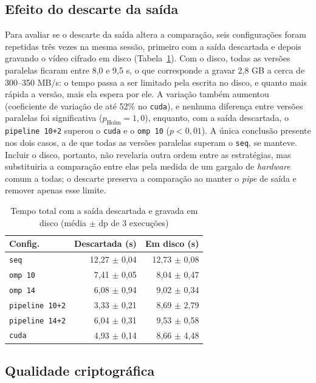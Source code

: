 \documentclass[12pt]{article}
\begin{document}
\subsection{Efeito do descarte da saída}
\label{sec:sensibilidade}

Para avaliar se o descarte da saída altera a comparação, seis configurações
foram repetidas três vezes na mesma sessão, primeiro com a saída descartada e
depois gravando o vídeo cifrado em disco (Tabela~\ref{tab:disco}). Com o disco,
todas as versões paralelas ficaram entre 8,0 e 9,5 s, o que corresponde a gravar
2,8 GB a cerca de 300--350 MB/s: o tempo passa a ser limitado pela escrita no
disco, e quanto mais rápida a versão, mais ela espera por ele. A variação
também aumentou (coeficiente de variação de até 52\% no \texttt{cuda}), e
nenhuma diferença entre versões paralelas foi significativa ($p_{\mathrm{Holm}}
= 1{,}0$), enquanto, com a saída descartada, o \texttt{pipeline 10+2} superou o
\texttt{cuda} e o \texttt{omp 10} ($p < 0{,}01$). A única conclusão presente
nos dois casos, a de que todas as versões paralelas superam o \texttt{seq}, se
manteve. Incluir o disco, portanto, não revelaria outra ordem entre as
estratégias, mas substituiria a comparação entre elas pela medida de um
gargalo de \textit{hardware} comum a todas; o descarte preserva a comparação ao
manter o \textit{pipe} de saída e remover apenas esse limite.

\begin{table}[ht]
\centering
\small
\caption{Tempo total com a saída descartada e gravada em disco (média $\pm$ dp
de 3 execuções)}
\label{tab:disco}
\begin{tabular}{lrr}
\hline
\textbf{Config.} & \textbf{Descartada (s)} & \textbf{Em disco (s)} \\
\hline
\texttt{seq}           & 12,27 $\pm$ 0,04 & 12,73 $\pm$ 0,08 \\
\texttt{omp 10}        & 7,41 $\pm$ 0,05  & 8,04 $\pm$ 0,47 \\
\texttt{omp 14}        & 6,08 $\pm$ 0,94  & 9,02 $\pm$ 0,34 \\
\texttt{pipeline 10+2} & 3,33 $\pm$ 0,21  & 8,69 $\pm$ 2,79 \\
\texttt{pipeline 14+2} & 6,04 $\pm$ 0,31  & 9,53 $\pm$ 0,58 \\
\texttt{cuda}          & 4,93 $\pm$ 0,14  & 8,66 $\pm$ 4,48 \\
\hline
\end{tabular}
\end{table}

\subsection{Qualidade criptográfica}
\end{document}
